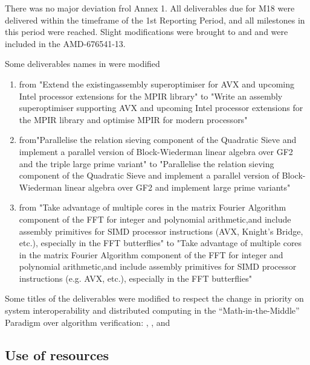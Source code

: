\documentclass{deliverablereport}
\begin{document}
  There was no major deviation frol Annex 1. All deliverables due for M18 were delivered
  within the timeframe of the 1st Reporting Period, and all milestones in this period were
  reached.  Slight modifications were brought to  and  and were
  included in the AMD-676541-13.


  Some deliverables names in  were modified
  \begin{enumerate}
  \item {} from "Extend the existingassembly
    superoptimiser for AVX and upcoming Intel processor extensions for the MPIR library"
    to "Write an assembly superoptimiser supporting AVX and upcoming Intel processor
    extensions for the MPIR library and optimise MPIR for modern processors"
  \item {} from"Parallelise the relation sieving component of the
    Quadratic Sieve and implement a parallel version of Block-Wiederman linear algebra
    over GF2 and the triple large prime variant" to "Parallelise the relation sieving
    component of the Quadratic Sieve and implement a parallel version of Block-Wiederman
    linear algebra over GF2 and implement large prime variants"
  \item {} from "Take advantage of multiple cores in the matrix Fourier
    Algorithm component of the FFT for integer and polynomial arithmetic,and include
    assembly primitives for SIMD processor instructions (AVX, Knight's Bridge, etc.),
    especially in the FFT butterflies" to "Take advantage of multiple cores in the matrix
    Fourier Algorithm component of the FFT for integer and polynomial arithmetic,and
    include assembly primitives for SIMD processor instructions (e.g. AVX, etc.),
    especially in the FFT butterflies"
  \end{enumerate}

  Some titles of the  deliverables were modified to respect the change in
  priority on system interoperability and distributed computing in the
  ``Math-in-the-Middle'' Paradigm over algorithm verification:
  , , and


  \subsection{Use of resources}
\end{document}

